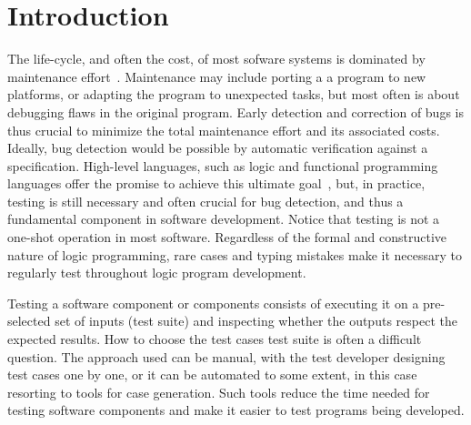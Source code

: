 
\section{Introduction}
\label{sec:intro}


The life-cycle, and often the cost, of most sofware systems is
dominated by maintenance effort~\cite{}.  
%
Maintenance may include porting a a program to new platforms, or
adapting the program to unexpected tasks, but most often is about
debugging flaws in the original program. Early detection and
correction of bugs is thus crucial to minimize the total maintenance
effort and its associated costs.
%
Ideally, bug detection would be possible by automatic verification
against a specification. High-level languages, such as logic and
functional programming languages offer the promise to achieve this
ultimate goal~\cite{}, but, in practice, testing is still necessary
and often crucial for bug detection, and thus a fundamental component
in software development. %
%
Notice that testing is not a one-shot operation in most software.
Regardless of the formal and constructive nature of logic programming,
rare cases and typing mistakes make it necessary to regularly test
throughout logic program development.

Testing a software component or components consists of executing it on
a pre-selected set of inputs (test suite) and inspecting whether the outputs
respect the expected results.
%
%
How to choose the test cases test suite is often a difficult
question. The approach used
can be  manual, with the test developer designing test cases one by
one, or it can be automated to some extent, in this case resorting to
tools for case generation.
%
Such tools reduce the time needed for testing software components and make
it easier to test programs being developed.
%

